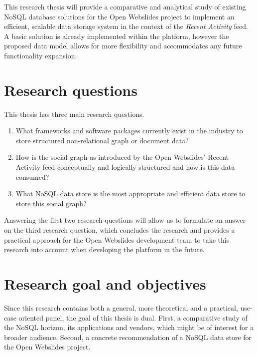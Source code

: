 This research thesis will provide a comparative and analytical study of existing NoSQL database solutions for the Open Webslides project to implement an efficient, scalable data storage system in the context of the \textit{Recent Activity} feed. A basic solution is already implemented within the platform, however the proposed data model allows for more flexibility and accommodates any future functionality expansion.

\section{Research questions}
\label{sec:research-questions}

This thesis has three main research questions.

\begin{enumerate}
  \item What frameworks and software packages currently exist in the industry to store structured non-relational graph or document data?
  \item How is the social graph as introduced by the Open Webslides' Recent Activity feed conceptually and logically structured and how is this data consumed?
  \item What NoSQL data store is the most appropriate and efficient data store to store this social graph?
\end{enumerate}

Answering the first two research questions will allow us to formulate an answer on the third research question, which concludes the research and provides a practical approach for the Open Webslides development team to take this research into account when developing the platform in the future.
                                                                                                            
\section{Research goal and objectives}
\label{sec:research-goal-and-objectives}

Since this research contains both a general, more theoretical and a practical, use-case oriented panel, the goal of this thesis is dual. First, a comparative study of the NoSQL horizon, its applications and vendors, which might be of interest for a broader audience. Second, a concrete recommendation of a NoSQL data store for the Open Webslides project.

